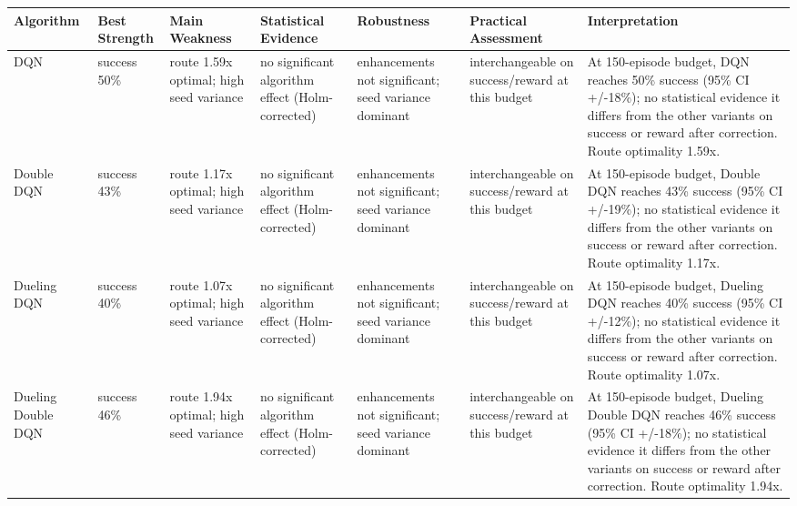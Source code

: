 \begin{tabular}{lllllll}
\toprule
Algorithm & Best Strength & Main Weakness & Statistical Evidence & Robustness & Practical Assessment & Interpretation \\
\midrule
DQN & success 50\% & route 1.59x optimal; high seed variance & no significant algorithm effect (Holm-corrected) & enhancements not significant; seed variance dominant & interchangeable on success/reward at this budget & At 150-episode budget, DQN reaches 50\% success (95\% CI +/-18\%); no statistical evidence it differs from the other variants on success or reward after correction. Route optimality 1.59x. \\
Double DQN & success 43\% & route 1.17x optimal; high seed variance & no significant algorithm effect (Holm-corrected) & enhancements not significant; seed variance dominant & interchangeable on success/reward at this budget & At 150-episode budget, Double DQN reaches 43\% success (95\% CI +/-19\%); no statistical evidence it differs from the other variants on success or reward after correction. Route optimality 1.17x. \\
Dueling DQN & success 40\% & route 1.07x optimal; high seed variance & no significant algorithm effect (Holm-corrected) & enhancements not significant; seed variance dominant & interchangeable on success/reward at this budget & At 150-episode budget, Dueling DQN reaches 40\% success (95\% CI +/-12\%); no statistical evidence it differs from the other variants on success or reward after correction. Route optimality 1.07x. \\
Dueling Double DQN & success 46\% & route 1.94x optimal; high seed variance & no significant algorithm effect (Holm-corrected) & enhancements not significant; seed variance dominant & interchangeable on success/reward at this budget & At 150-episode budget, Dueling Double DQN reaches 46\% success (95\% CI +/-18\%); no statistical evidence it differs from the other variants on success or reward after correction. Route optimality 1.94x. \\
\bottomrule
\end{tabular}
